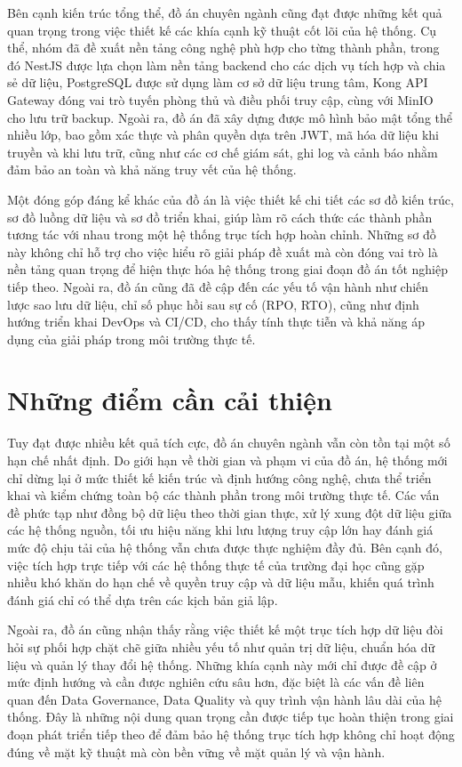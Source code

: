 Bên cạnh kiến trúc tổng thể, đồ án chuyên ngành cũng đạt được những kết quả quan trọng trong việc thiết kế các khía cạnh kỹ thuật cốt lõi của hệ thống. Cụ thể, nhóm đã đề xuất nền tảng công nghệ phù hợp cho từng thành phần, trong đó NestJS được lựa chọn làm nền tảng backend cho các dịch vụ tích hợp và chia sẻ dữ liệu, PostgreSQL được sử dụng làm cơ sở dữ liệu trung tâm, Kong API Gateway đóng vai trò tuyến phòng thủ và điều phối truy cập, cùng với MinIO cho lưu trữ backup. Ngoài ra, đồ án đã xây dựng được mô hình bảo mật tổng thể nhiều lớp, bao gồm xác thực và phân quyền dựa trên JWT, mã hóa dữ liệu khi truyền và khi lưu trữ, cũng như các cơ chế giám sát, ghi log và cảnh báo nhằm đảm bảo an toàn và khả năng truy vết của hệ thống.

Một đóng góp đáng kể khác của đồ án là việc thiết kế chi tiết các sơ đồ kiến trúc, sơ đồ luồng dữ liệu và sơ đồ triển khai, giúp làm rõ cách thức các thành phần tương tác với nhau trong một hệ thống trục tích hợp hoàn chỉnh. Những sơ đồ này không chỉ hỗ trợ cho việc hiểu rõ giải pháp đề xuất mà còn đóng vai trò là nền tảng quan trọng để hiện thực hóa hệ thống trong giai đoạn đồ án tốt nghiệp tiếp theo. Ngoài ra, đồ án cũng đã đề cập đến các yếu tố vận hành như chiến lược sao lưu dữ liệu, chỉ số phục hồi sau sự cố (RPO, RTO), cũng như định hướng triển khai DevOps và CI/CD, cho thấy tính thực tiễn và khả năng áp dụng của giải pháp trong môi trường thực tế.

\section{Những điểm cần cải thiện}
Tuy đạt được nhiều kết quả tích cực, đồ án chuyên ngành vẫn còn tồn tại một số hạn chế nhất định. Do giới hạn về thời gian và phạm vi của đồ án, hệ thống mới chỉ dừng lại ở mức thiết kế kiến trúc và định hướng công nghệ, chưa thể triển khai và kiểm chứng toàn bộ các thành phần trong môi trường thực tế. Các vấn đề phức tạp như đồng bộ dữ liệu theo thời gian thực, xử lý xung đột dữ liệu giữa các hệ thống nguồn, tối ưu hiệu năng khi lưu lượng truy cập lớn hay đánh giá mức độ chịu tải của hệ thống vẫn chưa được thực nghiệm đầy đủ. Bên cạnh đó, việc tích hợp trực tiếp với các hệ thống thực tế của trường đại học cũng gặp nhiều khó khăn do hạn chế về quyền truy cập và dữ liệu mẫu, khiến quá trình đánh giá chỉ có thể dựa trên các kịch bản giả lập.

Ngoài ra, đồ án cũng nhận thấy rằng việc thiết kế một trục tích hợp dữ liệu đòi hỏi sự phối hợp chặt chẽ giữa nhiều yếu tố như quản trị dữ liệu, chuẩn hóa dữ liệu và quản lý thay đổi hệ thống. Những khía cạnh này mới chỉ được đề cập ở mức định hướng và cần được nghiên cứu sâu hơn, đặc biệt là các vấn đề liên quan đến Data Governance, Data Quality và quy trình vận hành lâu dài của hệ thống. Đây là những nội dung quan trọng cần được tiếp tục hoàn thiện trong giai đoạn phát triển tiếp theo để đảm bảo hệ thống trục tích hợp không chỉ hoạt động đúng về mặt kỹ thuật mà còn bền vững về mặt quản lý và vận hành.

